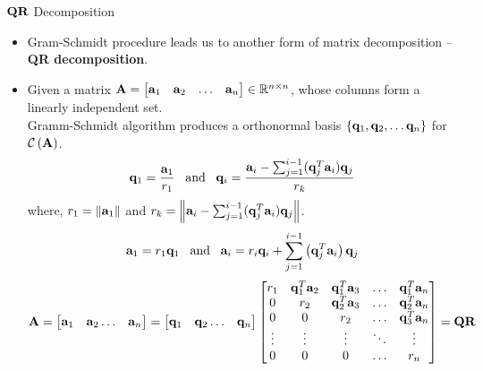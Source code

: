 \documentclass[aspectratio=169]{beamer}
\def\mf{\ensuremath\mathbf}
\def\mb{\ensuremath\mathbb}
\def\mc{\ensuremath\mathcal}
\def\lp{\ensuremath\left(}
\def\rp{\ensuremath\right)}
\begin{document}
\begin{frame}[t]{$\mf{QR}$ Decomposition}
\vspace{-0.25cm}
\begin{footnotesize}
\begin{itemize}
    \item Gram-Schmidt procedure leads us to another form of matrix  decomposition -- \textbf{QR decomposition}.
    \item Given a matrix $\mf{A} = \begin{bmatrix*}\mf{a}_1&\mf{a}_2&\ldots&\mf{a}_n\end{bmatrix*} \in \mb{R}^{n \times n}$, whose columns form a linearly independent set.\\
    Gramm-Schmidt algorithm produces a orthonormal basis $\left\{\mf{q}_1, \mf{q}_2, \ldots \mf{q}_n\right\}$ for $\mc{C}\lp \mf{A}\rp $.
    \[ \mf{q}_1 = \frac{\mf{a}_1}{r_1}\,\,\,\text{ and }\,\,\, \mf{q}_i = \frac{\mf{a}_i - \sum_{j=1}^{i-1}(\mf{q}_j^T\mf{a}_i)\mf{q}_j}{r_k} \]
    where, $r_1 = \left\lVert \mf{a}_1\right\rVert$ and $r_k = \left\lVert \mf{a}_i - \sum_{j=1}^{i-1}(\mf{q}_j^T\mf{a}_i)\mf{q}_j\right\rVert$.
    \[ \mf{a}_1 = r_1\mf{q}_1\,\,\,\text{ and }\,\,\,\mf{a}_i = r_i\mf{q}_i + \sum_{j=1}^{i-1}\lp \mf{q}_j^T\mf{a}_i\rp \mf{q}_j\]
    \[ \mf{A} = \begin{bmatrix*}\mf{a}_1 & \mf{a}_2 \ldots & \mf{a}_n\end{bmatrix*} =  \begin{bmatrix*}\mf{q}_1 & \mf{q}_2 \ldots & \mf{q}_n\end{bmatrix*}
    \begin{bmatrix*}
    r_1 & \mf{q}_1^T\mf{a}_2 & \mf{q}_1^T\mf{a}_3 & \ldots & \mf{q}_1^T\mf{a}_n\\
    0 & r_2 & \mf{q}_2^T\mf{a}_3 & \ldots & \mf{q}_2^T\mf{a}_n\\
    0 & 0 & r_2 & \ldots & \mf{q}_3^T\mf{a}_n\\
    \vdots & \vdots & \vdots & \ddots & \vdots\\
    0 & 0 & 0 & \ldots & r_n\\\end{bmatrix*} = \mf{QR} \]
\end{itemize}
\end{footnotesize}
\end{frame}
\end{document}
